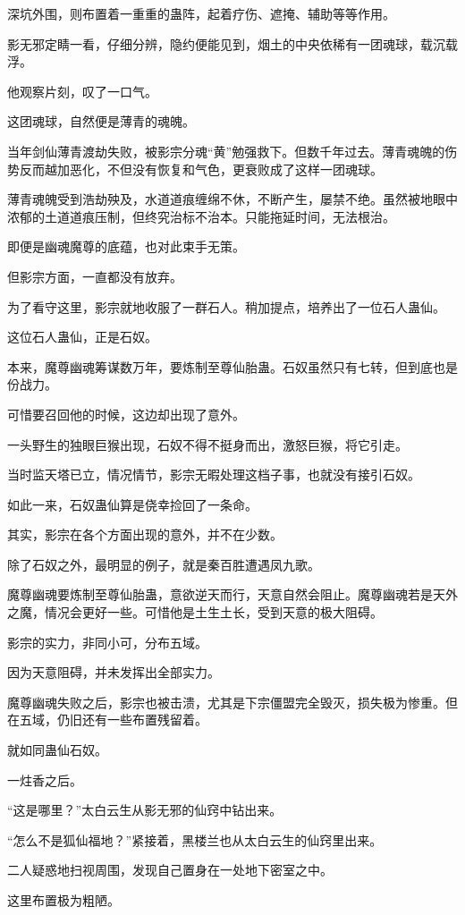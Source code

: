 \begin{this_body}
深坑外围，则布置着一重重的蛊阵，起着疗伤、遮掩、辅助等等作用。

影无邪定睛一看，仔细分辨，隐约便能见到，烟土的中央依稀有一团魂球，载沉载浮。

他观察片刻，叹了一口气。

这团魂球，自然便是薄青的魂魄。

当年剑仙薄青渡劫失败，被影宗分魂“黄”勉强救下。但数千年过去。薄青魂魄的伤势反而越加恶化，不但没有恢复和气色，更衰败成了这样一团魂球。

薄青魂魄受到浩劫殃及，水道道痕缠绵不休，不断产生，屡禁不绝。虽然被地眼中浓郁的土道道痕压制，但终究治标不治本。只能拖延时间，无法根治。

即便是幽魂魔尊的底蕴，也对此束手无策。

但影宗方面，一直都没有放弃。

为了看守这里，影宗就地收服了一群石人。稍加提点，培养出了一位石人蛊仙。

这位石人蛊仙，正是石奴。

本来，魔尊幽魂筹谋数万年，要炼制至尊仙胎蛊。石奴虽然只有七转，但到底也是份战力。

可惜要召回他的时候，这边却出现了意外。

一头野生的独眼巨猴出现，石奴不得不挺身而出，激怒巨猴，将它引走。

当时监天塔已立，情况情节，影宗无暇处理这档子事，也就没有接引石奴。

如此一来，石奴蛊仙算是侥幸捡回了一条命。

其实，影宗在各个方面出现的意外，并不在少数。

除了石奴之外，最明显的例子，就是秦百胜遭遇凤九歌。

魔尊幽魂要炼制至尊仙胎蛊，意欲逆天而行，天意自然会阻止。魔尊幽魂若是天外之魔，情况会更好一些。可惜他是土生土长，受到天意的极大阻碍。

影宗的实力，非同小可，分布五域。

因为天意阻碍，并未发挥出全部实力。

魔尊幽魂失败之后，影宗也被击溃，尤其是下宗僵盟完全毁灭，损失极为惨重。但在五域，仍旧还有一些布置残留着。

就如同蛊仙石奴。

一炷香之后。

“这是哪里？”太白云生从影无邪的仙窍中钻出来。

“怎么不是狐仙福地？”紧接着，黑楼兰也从太白云生的仙窍里出来。

二人疑惑地扫视周围，发现自己置身在一处地下密室之中。

这里布置极为粗陋。


\end{this_body}
